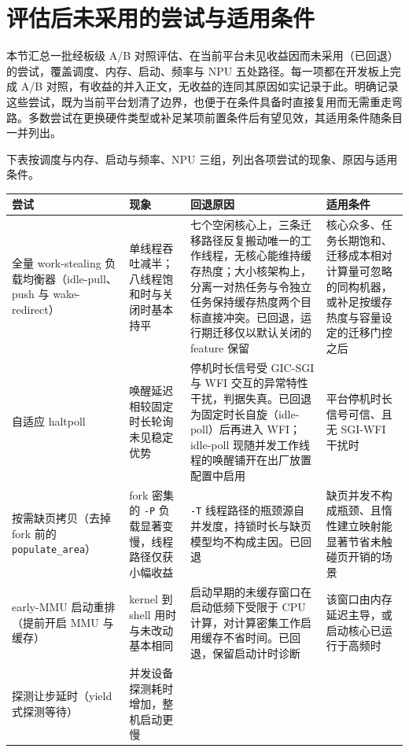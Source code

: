 \section{评估后未采用的尝试与适用条件}

本节汇总一批经板级 A/B 对照评估、在当前平台未见收益因而未采用（已回退）的尝试，覆盖调度、内存、启动、频率与 NPU 五处路径。每一项都在开发板上完成 A/B 对照，有收益的并入正文，无收益的连同其原因如实记录于此。明确记录这些尝试，既为当前平台划清了边界，也便于在条件具备时直接复用而无需重走弯路。多数尝试在更换硬件类型或补足某项前置条件后有望见效，其适用条件随条目一并列出。

下表按调度与内存、启动与频率、NPU 三组，列出各项尝试的现象、原因与适用条件。

\begin{table}[H]\centering\small
\begin{tabular}{@{}>{\raggedright\arraybackslash}p{2.5cm}>{\raggedright\arraybackslash}p{2.6cm}>{\raggedright\arraybackslash}p{5.6cm}>{\raggedright\arraybackslash}p{3.4cm}@{}}
\toprule
尝试 & 现象 & 回退原因 & 适用条件 \\
\midrule
全量 work-stealing 负载均衡器（idle-pull、push 与 wake-redirect） &
单线程吞吐减半；八线程饱和时与关闭时基本持平 &
七个空闲核心上，三条迁移路径反复搬动唯一的工作线程，无核心能维持缓存热度；大小核架构上，分离一对热任务与令独立任务保持缓存热度两个目标直接冲突。已回退，运行期迁移仅以默认关闭的 feature 保留 &
核心众多、任务长期饱和、迁移成本相对计算量可忽略的同构机器，或补足按缓存热度与容量设定的迁移门控之后 \\
\addlinespace
自适应 haltpoll &
唤醒延迟相较固定时长轮询未见稳定优势 &
停机时长信号受 GIC-SGI 与 WFI 交互的异常特性干扰，判据失真。已回退为固定时长自旋（idle-poll）后再进入 WFI；idle-poll 现随并发工作线程的唤醒铺开在出厂放置配置中启用 &
平台停机时长信号可信、且无 SGI-WFI 干扰时 \\
\addlinespace
按需缺页拷贝（去掉 fork 前的 \texttt{populate\_area}） &
fork 密集的 \texttt{-P} 负载显著变慢，线程路径仅获小幅收益 &
\texttt{-T} 线程路径的瓶颈源自并发度，持锁时长与缺页模型均不构成主因。已回退 &
缺页并发不构成瓶颈、且惰性建立映射能显著节省未触碰页开销的场景 \\
\addlinespace
early-MMU 启动重排（提前开启 MMU 与缓存） &
kernel 到 shell 用时与未改动基本相同 &
启动早期的未缓存窗口在启动低频下受限于 CPU 计算，对计算密集工作启用缓存不省时间。已回退，保留启动计时诊断 &
该窗口由内存延迟主导，或启动核心已运行于高频时 \\
\addlinespace
探测让步延时（yield 式探测等待） &
并发设备探测耗时增加，整机启动更慢 &

\end{tabular}
\end{table}
